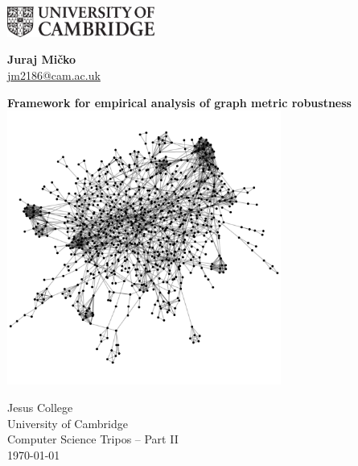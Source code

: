\documentclass[12pt,a4paper,twoside,openany]{report}
\begin{document}

    \pagestyle{empty}

    \begin{minipage}{.45\linewidth}
        \begin{flushleft}
            \includegraphics[height=10mm]{uc-black-white.eps}
        \end{flushleft}
    \end{minipage}
    \hfill
    \begin{minipage}{.45\linewidth}
        \begin{flushright}
            \Large \textbf{Juraj Mi\v{c}ko} \\
            \normalsize \href{mailto:jm2186@cam.ac.uk}{jm2186@cam.ac.uk}
        \end{flushright}
    \end{minipage}

    \vspace*{45mm}
    \begin{center}
        \LARGE
        \textbf{Framework for empirical analysis of graph metric robustness} \\[5mm]

        \vspace{5mm}
        \includegraphics[height=9cm]{cover_graph_img.png}
        \vspace{5mm}

        \Large
        Jesus College \\
        University of Cambridge \\[5mm]
        Computer Science Tripos -- Part II \\[5mm]
        \today  %
    \end{center}
\end{document}

